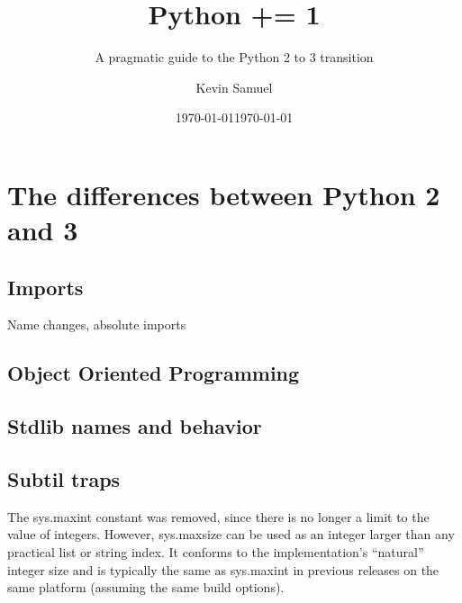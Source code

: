 \documentclass[paperwidth=8in, paperheight=10in,lang=en]{elegantbook}
\title{Python += 1}
\subtitle{A pragmatic guide to the Python 2 to 3 transition}
\institute{Bite Code}
\date{\today}
\author{Kevin Samuel}
\date{\today}
\begin{document}
\maketitle

\frontmatter

\tableofcontents



\mainmatter

\hypersetup{pageanchor=true}

\part{The differences between Python 2 and 3}











\chapter{Imports}

Name changes, absolute imports


\chapter{Object Oriented Programming}\label{chap:oop}

\chapter{Stdlib names and behavior}

\chapter{Subtil traps}

The sys.maxint constant was removed, since there is no longer a limit to the value of integers. However, sys.maxsize can be used as an integer larger than any practical list or string index. It conforms to the implementation’s “natural” integer size and is typically the same as sys.maxint in previous releases on the same platform (assuming the same build options).
\end{document}
